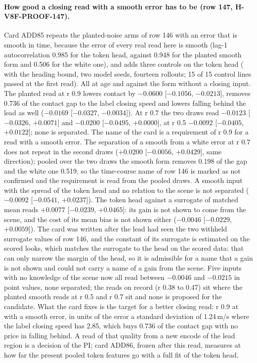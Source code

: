 \paragraph{How good a closing read with a smooth error has to be (row 147, H-V8F-PROOF-147).} Card ADD85 repeats the planted-noise arms of row 146 with an error that is smooth in time, because the error of every real read here is smooth (lag-1 autocorrelation 0.985 for the token head, against 0.948 for the planted smooth form and 0.506 for the white one), and adds three controls on the token head ( with the heading bound, two model seeds, fourteen rollouts; 15 of 15 control lines passed at the first read). All at age and against the form without a closing input. The planted read at r 0.9 lowers contact by $-0.0600$ [$-0.1056$, $-0.0213$], removes 0.736 of the contact gap to the label closing speed and lowers falling behind the lead as well ($-0.0169$ [$-0.0327$, $-0.0034$]). At r 0.7 the two draws read $-0.0123$ [$-0.0326$, $+0.0071$] and $-0.0200$ [$-0.0495$, $+0.0000$], at r 0.5 $-0.0092$ [$-0.0405$, $+0.0122$]; none is separated. The name of the card is a requirement of r 0.9 for a read with a smooth error. The separation of a smooth from a white error at r 0.7 does not repeat in the second draws ($+0.0200$ [$-0.0056$, $+0.0429$], same direction); pooled over the two draws the smooth form removes 0.198 of the gap and the white one 0.519, so the time-course name of row 146 is marked as not confirmed and the requirement is read from the pooled draws. A smooth input with the spread of the token head and no relation to the scene is not separated ($-0.0092$ [$-0.0541$, $+0.0237$]). The token head against a surrogate of matched mean reads $+0.0077$ [$-0.0239$, $+0.0465$]: its gain is not shown to come from the scene, and the cost of its mean bias is not shown either ($-0.0046$ [$-0.0229$, $+0.0059$]). The card was written after the lead had seen the two withheld surrogate values of row 146, and the constant of its surrogate is estimated on the scored looks, which matches the surrogate to the head on the scored data: that can only narrow the margin of the head, so it is admissible for a name that a gain is not shown and could not carry a name of a gain from the scene. Five inputs with no knowledge of the scene now all read between $-0.0046$ and $-0.0215$ in point values, none separated; the reads on record (r 0.38 to 0.47) sit where the planted smooth reads at r 0.5 and r 0.7 sit and none is proposed for the candidate. What the card fixes is the target for a better closing read: r 0.9 at  with a smooth error, in units of the error a standard deviation of 1.24\,m/s where the label closing speed has 2.85, which buys 0.736 of the contact gap with no price in falling behind. A read of that quality from a new encode of the lead region is a decision of the PI; card ADD86, frozen after this read, measures at  how far the present pooled token features go with a full fit of the token head.

